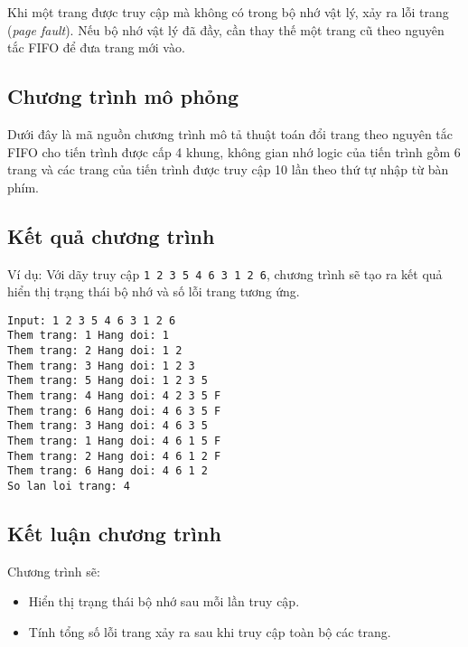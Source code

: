 Khi một trang được truy cập mà không có trong bộ nhớ vật lý, xảy ra lỗi trang (\textit{page fault}). Nếu bộ nhớ vật lý đã đầy, cần thay thế một trang cũ theo nguyên tắc FIFO để đưa trang mới vào.

\subsection{Chương trình mô phỏng}
Dưới đây là mã nguồn chương trình mô tả thuật toán đổi trang theo nguyên tắc FIFO cho tiến trình được cấp 4 khung, không gian nhớ logic của tiến trình gồm 6 trang và các trang của tiến trình được truy cập 10 lần theo thứ tự nhập từ bàn phím.



\subsection{Kết quả chương trình}
Ví dụ: Với dãy truy cập \texttt{1 2 3 5 4 6 3 1 2 6}, chương trình sẽ tạo ra kết quả hiển thị trạng thái bộ nhớ và số lỗi trang tương ứng.

\begin{lstlisting}
Input: 1 2 3 5 4 6 3 1 2 6
Them trang: 1 Hang doi: 1 
Them trang: 2 Hang doi: 1 2 
Them trang: 3 Hang doi: 1 2 3 
Them trang: 5 Hang doi: 1 2 3 5 
Them trang: 4 Hang doi: 4 2 3 5 F
Them trang: 6 Hang doi: 4 6 3 5 F
Them trang: 3 Hang doi: 4 6 3 5 
Them trang: 1 Hang doi: 4 6 1 5 F
Them trang: 2 Hang doi: 4 6 1 2 F
Them trang: 6 Hang doi: 4 6 1 2 
So lan loi trang: 4
\end{lstlisting}

\subsection{Kết luận chương trình}
Chương trình sẽ:
\begin{itemize}
    \item Hiển thị trạng thái bộ nhớ sau mỗi lần truy cập.
    \item Tính tổng số lỗi trang xảy ra sau khi truy cập toàn bộ các trang.
\end{itemize}
